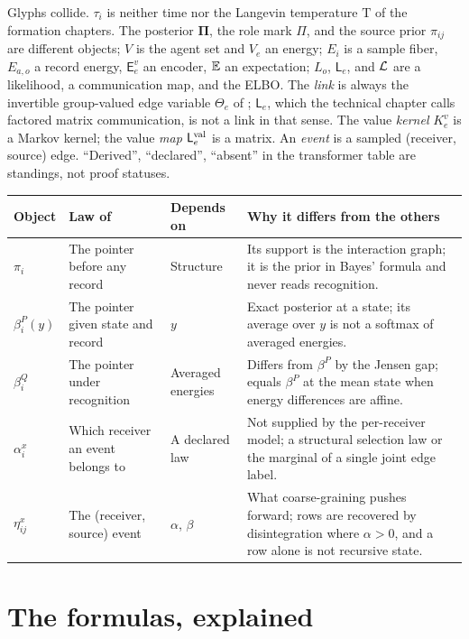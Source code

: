 Glyphs collide. $\tau_i$ is neither time nor the Langevin temperature $\mathrm T$ of the formation chapters. The
posterior $\boldsymbol\Pi$, the role mark $\Pi$, and the source prior $\pi_{ij}$ are different objects; $V$ is the
agent set and $V_e$ an energy; $E_i$ is a sample fiber, $E_{a,o}$ a record energy, $\mathsf E^v_e$ an encoder, $\mathbb E$
an expectation; $L_o$, $\mathsf L_e$, and $\mathcal L$ are a likelihood, a communication map, and the ELBO. The
\emph{link} is always the invertible group-valued edge variable $\Theta_e$ of ; $\mathsf L_e$,
which the technical chapter calls factored matrix communication, is not a link in that sense. The value
\emph{kernel} $K^v_e$ is a Markov kernel; the value \emph{map} $\mathsf L^{\rm val}_e$ is a matrix. An \emph{event} is a
sampled (receiver, source) edge. ``Derived'', ``declared'', ``absent'' in the transformer table are standings, not
proof statuses.

\begingroup\small
\begin{longtable}{@{}>{\raggedright\arraybackslash}p{}>{\raggedright\arraybackslash}p{}>{\raggedright\arraybackslash}p{}>{\raggedright\arraybackslash}p{}@{}}
\toprule
\textbf{Object} & \textbf{Law of} & \textbf{Depends on} & \textbf{Why it differs from the others}\\
\midrule
$\pi_i$ & The pointer before any record & Structure & Its support is the interaction graph; it is the prior in Bayes' formula and never reads recognition.\\
$\beta^P_i(y)$ & The pointer given state and record & $y$ & Exact posterior at a state; its average over $y$ is not a softmax of averaged energies.\\
$\beta^Q_i$ & The pointer under recognition & Averaged energies & Differs from $\beta^P$ by the Jensen gap; equals $\beta^P$ at the mean state when energy differences are affine.\\
$\alpha^x_i$ & Which receiver an event belongs to & A declared law & Not supplied by the per-receiver model; a structural selection law or the marginal of a single joint edge label.\\
$\eta^x_{ij}$ & The (receiver, source) event & $\alpha$, $\beta$ & What coarse-graining pushes forward; rows are recovered by disintegration where $\alpha>0$, and a row alone is not recursive state.\\
\bottomrule
\end{longtable}
\endgroup

\section{The formulas, explained}
\label{comp:ch06-formulas}

